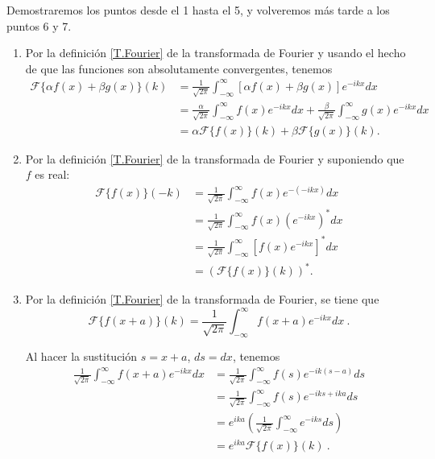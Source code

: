 \begin{demo}
Demostraremos los puntos desde el 1 hasta el 5, y volveremos más tarde a los puntos 6 y 7.

\begin{enumerate}
    \item Por la definición \eqref{T.Fourier} de la transformada de Fourier y usando el hecho de que las funciones son absolutamente convergentes, tenemos
    \begin{align*}
        \mathcal{F}\{\alpha f(x) + \beta g(x)\}(k) &= \frac{1}{\sqrt{2\pi}} \int_{-\infty}^{\infty} [\alpha f(x) + \beta g(x)] e^{-ikx} dx \\
        &= \frac{\alpha}{\sqrt{2\pi}} \int_{-\infty}^{\infty}  f(x) e^{-ikx} dx + \frac{\beta}{\sqrt{2\pi}} \int_{-\infty}^{\infty}  g(x) e^{-ikx} dx \\
        &= \alpha \mathcal{F}\{f(x)\}(k) + \beta \mathcal{F}\{g(x)\}(k).
    \end{align*}
    
    \item Por la definición \eqref{T.Fourier} de la transformada de Fourier y suponiendo que $f$ es real:
    \begin{align*}
        \mathcal{F}\{f(x)\}(-k) &= \frac{1}{\sqrt{2\pi}} \int_{-\infty}^{\infty}  f(x)  e^{-(-ikx)} dx  \\
        &= \frac{1}{\sqrt{2\pi}} \int_{-\infty}^{\infty}  f(x)  (e^{-ikx})^* dx  \\
        &= \frac{1}{\sqrt{2\pi}} \int_{-\infty}^{\infty}  [f(x)  e^{-ikx}]^* dx \\
        &= (\mathcal{F}\{f(x)\}(k))^*.
    \end{align*}

    \item Por la definición \eqref{T.Fourier} de la transformada de Fourier, se tiene que
    \begin{equation*}
        \mathcal{F}\{f(x+a)\}(k) = \frac{1}{\sqrt{2\pi}}\int_{-\infty}^\infty f(x+a) e^{-ikx} dx \ .
    \end{equation*}

    Al hacer la sustitución $s = x+a$, $ds = dx$, tenemos
    \begin{align*}
        \frac{1}{\sqrt{2\pi}} \int_{-\infty}^\infty f(x+a)e^{-ikx}dx & = \frac{1}{\sqrt{2\pi}} \int_{-\infty}^\infty f(s) e^{-ik(s-a)} ds \\
        & = \frac{1}{\sqrt{2\pi}} \int_{-\infty}^\infty f(s) e^{-iks+ika} ds \\
        & = e^{ika} \left(\frac{1}{\sqrt{2\pi}} \int_{-\infty}^\infty e^{-iks} ds \right) \\
        & = e^{ika} \mathcal{F}\{f(x)\} (k) \ .
    \end{align*}


\end{enumerate}
\end{demo}
